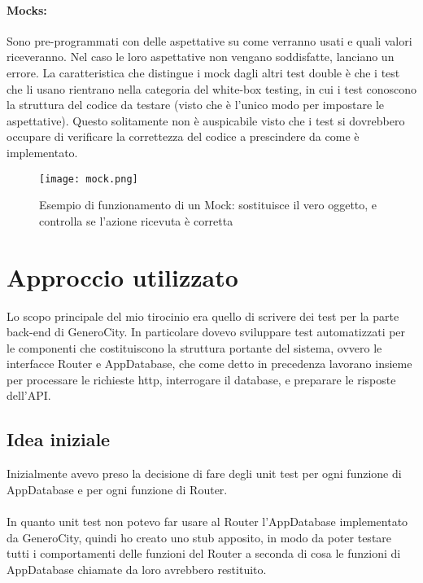 \documentclass[italian, oneside]{sapthesis} %
\begin{document}
		\paragraph*{Mocks:}
		Sono pre-programmati con delle aspettative su come verranno usati e quali valori riceveranno. Nel caso le loro aspettative non vengano soddisfatte, lanciano un errore.
		La caratteristica che distingue i mock dagli altri test double \`e che i test che li usano rientrano nella categoria del white-box testing, in cui i test conoscono la struttura del codice da testare (visto che \`e l'unico modo per impostare le aspettative). Questo solitamente non \`e auspicabile visto che i test si dovrebbero occupare di verificare la correttezza del codice a prescindere da come \`e implementato.
		\vspace*{0.2in}
		\begin{figure}[t]
			\begin{center}
			\texttt{[image: mock.png]}
			\captionsetup{justification=centering}
			\caption{Esempio di funzionamento di un Mock: sostituisce il vero oggetto, e controlla se l'azione ricevuta \`e corretta}
			\label{fig:7}
		\end{center}
		\end{figure}

		\pagebreak
		
	\section{Approccio utilizzato}
		Lo scopo principale del mio tirocinio era quello di scrivere dei test per la parte back-end di GeneroCity. In particolare dovevo sviluppare test automatizzati per le componenti che costituiscono la struttura portante del sistema, ovvero le interfacce Router e AppDatabase, che come detto in precedenza lavorano insieme per processare le richieste http, interrogare il database, e preparare le risposte dell'API. 

		\subsection{Idea iniziale}
		Inizialmente avevo preso la decisione di fare degli unit test per ogni funzione di AppDatabase e per ogni funzione di Router.

		\paragraph*{}
		In quanto unit test non potevo far usare al Router l'AppDatabase implementato da GeneroCity, quindi ho creato uno stub apposito, in modo da poter testare tutti i comportamenti delle funzioni del Router a seconda di cosa le funzioni di AppDatabase chiamate da loro avrebbero restituito.
\end{document}
